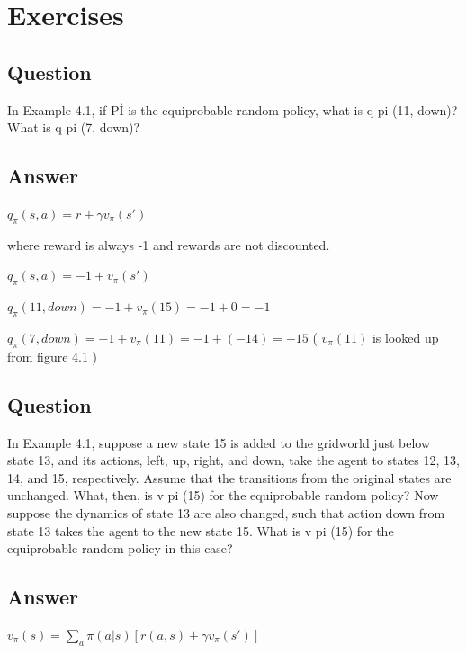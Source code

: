 \documentclass[11pt]{article}
\begin{document}
    \maketitle
    \setcounter{section}{3}


    \section{Exercises}

    \subsection{Question}
    In Example 4.1, if Pİ is the equiprobable random policy, what is q pi (11, down)?
    What is q pi (7, down)?

    \subsection*{Answer}

    $ q_\pi(s,a) = r + \gamma v_\pi (s') $

    where reward is always -1 and rewards are not discounted.

    $ q_\pi(s,a) = -1 + v_\pi (s') $

    $ q_\pi(11,down) = -1 + v_\pi (15) = -1 + 0 = -1  $

    $ q_\pi(7,down) = -1 + v_\pi (11) = -1 + (-14) = -15 $ ( $v_\pi (11)$  is looked up from figure 4.1 )

    \subsection{Question}

    In Example 4.1, suppose a new state 15 is added to the gridworld just below state 13, and its actions, left, up, right, and down, take the agent to states 12, 13, 14, and 15, respectively.
    Assume that the transitions from the original states are unchanged.
    What, then, is v pi (15) for the equiprobable random policy?
    Now suppose the dynamics of state 13 are also changed, such that action down from state 13 takes the agent to the new state 15.
    What is v pi (15) for the equiprobable random policy in this case?

    \subsection*{Answer}

    $ v_\pi(s) = \sum_{a}^{} \pi(a|s) [r(a,s) + \gamma v_\pi (s')] $
\end{document}

